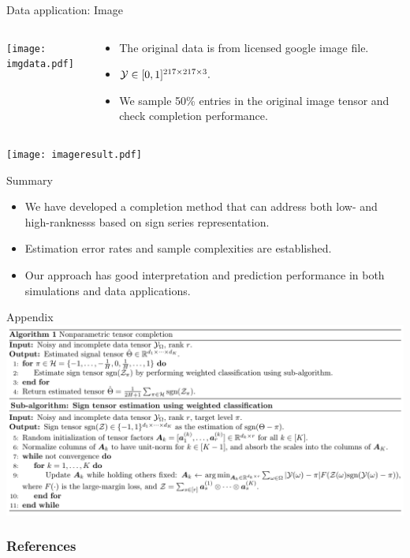 \documentclass[10pt, mathserif]{beamer} %
\theoremstyle{definition}
\theoremstyle{plain}
\begin{document}
\begin{frame}{Data application: Image}
 \begin{columns}
\begin{column}{0.20\textwidth}
   \begin{center}
     \texttt{[image: imgdata.pdf]}
     \end{center}
\end{column}
\begin{column}{0.7\textwidth} 
\begin{itemize}
    \item The original data is from licensed google image file.
    \item  $\mathcal{Y}\in[0,1]^{217\times217\times3}.$ 
    \item We sample 50\% entries in the original image tensor and check completion performance.
\end{itemize}
\end{column}
\end{columns}


      \begin{center}
    \texttt{[image: imageresult.pdf]}
    \end{center}
\end{frame}

\begin{frame}{Summary}
\begin{itemize}
    \item We have developed a completion method that can address {\color{red} both low- and high-ranknesss}  based on {\color{red}sign series representation}.
    \item {\color{red}Estimation error rates }and {\color{red}sample complexities} are established.
    \item Our approach has good interpretation and prediction performance in both simulations and data applications.
    
\end{itemize}
    
\end{frame}



\appendix
\begin{frame}{Appendix}
    \includegraphics[width = \textwidth]{algorithm.pdf}
\end{frame}

\begin{frame}[allowframebreaks]
        \frametitle{References}
 

\end{frame}
\end{document}
